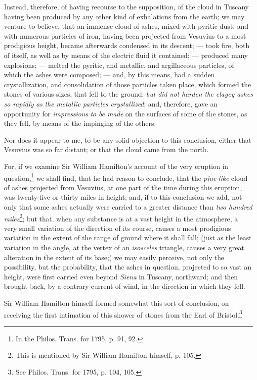 \documentclass[a4paper, 12pt, oneside]{article}
\begin{document}
Instead, therefore, of having recourse to the supposition, of the cloud in Tuscany having been produced by any other kind of exhalations from the earth; we may venture to believe, that an immense cloud of ashes, mixed with pyritic dust, and with numerous particles of iron, having been projected from Vesuvius to a most prodigious height, became afterwards condensed in its descent; --- took fire, both of itself, as well as by means of the electric fluid it contained; --- produced many explosions; --- melted the pyritic, and metallic, and argillaceous particles, of which the ashes were composed; --- and, by this means, had a sudden crystallization, and consolidation of those particles taken place, which formed the stones of various sizes, that fell to the ground: \emph{but did not harden the clayey ashes so rapidly as the metallic particles crystallized}; and, therefore, gave an opportunity for \emph{impressions to be made} on the surfaces of some of the stones, as they fell, by means of the impinging of the others.

Nor does it appear to me, to be any solid objection to this conclusion, either that Vesuvius was so far distant; or that the cloud came from the north.

For, if we examine Sir William Hamilton's account of the very eruption in question,\footnote{In the Philos. Trans. for 1795, p. 91, 92.} we shall find, that he had reason to conclude, that the \emph{pine-like} cloud of ashes projected from Vesuvius, at one part of the time during this eruption, was twenty-five or thirty miles in height; and, if to this conclusion we add, not only that some ashes actually were carried to a greater distance than \emph{two hundred miles}\footnote{This is mentioned by Sir William Hamilton himself, p. 105.}; but that, when any substance is at a vast height in the atmosphere, a very small variation of the direction of its course, causes a most prodigious variation in the extent of the range of ground where it shall fall; (just as the least variation in the angle, at the vertex of an \emph{isosceles} triangle, causes a very great alteration in the extent of its base;) we may easily perceive, not only the possibility, but the probability, that the ashes in question, projected to so vast an height, were first carried even beyond \emph{Siena} in Tuscany, northward; and then brought back, by a contrary current of wind, in the direction in which they fell.

Sir William Hamilton himself formed somewhat this sort of conclusion, on receiving the first intimation of this shower of stones from the Earl of Bristol.\footnote{See Philos. Trans. for 1795, p. 104, 105.}
\end{document}
